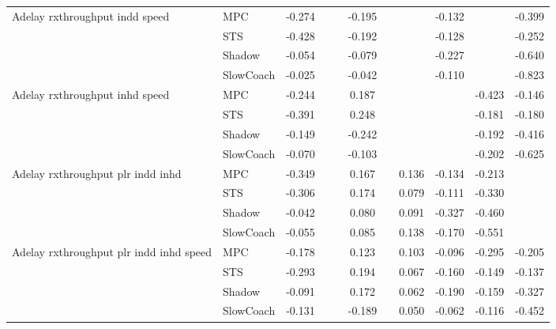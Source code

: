 \begin{tabular}{|l|l|*{9}{c|}}
\midrule
Adelay rxthroughput indd speed    & MPC &   -0.274 &        &        & -0.195 &     &     &  -0.132 &      &   -0.399 \\
                              & STS &   -0.428 &        &        & -0.192 &     &     &  -0.128 &      &   -0.252 \\
                              & Shadow &   -0.054 &        &        & -0.079 &     &     &  -0.227 &      &   -0.640 \\
                              & SlowCoach &   -0.025 &        &        & -0.042 &     &     &  -0.110 &      &   -0.823 \\
\midrule
Adelay rxthroughput inhd speed    & MPC &   -0.244 &        &        &  0.187 &     &     &      &  -0.423 &   -0.146 \\
                              & STS &   -0.391 &        &        &  0.248 &     &     &      &  -0.181 &   -0.180 \\
                              & Shadow &   -0.149 &        &        & -0.242 &     &     &      &  -0.192 &   -0.416 \\
                              & SlowCoach &   -0.070 &        &        & -0.103 &     &     &      &  -0.202 &   -0.625 \\
\midrule
Adelay rxthroughput plr indd inhd    & MPC &   -0.349 &        &        &  0.167 &     &  0.136 &  -0.134 &  -0.213 &       \\
                              & STS &   -0.306 &        &        &  0.174 &     &  0.079 &  -0.111 &  -0.330 &       \\
                              & Shadow &   -0.042 &        &        &  0.080 &     &  0.091 &  -0.327 &  -0.460 &       \\
                              & SlowCoach &   -0.055 &        &        &  0.085 &     &  0.138 &  -0.170 &  -0.551 &       \\
\midrule
Adelay rxthroughput plr indd inhd speed    & MPC &   -0.178 &        &        &  0.123 &     &  0.103 &  -0.096 &  -0.295 &   -0.205 \\
                              & STS &   -0.293 &        &        &  0.194 &     &  0.067 &  -0.160 &  -0.149 &   -0.137 \\
                              & Shadow &   -0.091 &        &        &  0.172 &     &  0.062 &  -0.190 &  -0.159 &   -0.327 \\
                              & SlowCoach &   -0.131 &        &        & -0.189 &     &  0.050 &  -0.062 &  -0.116 &   -0.452 \\

\end{tabular}
